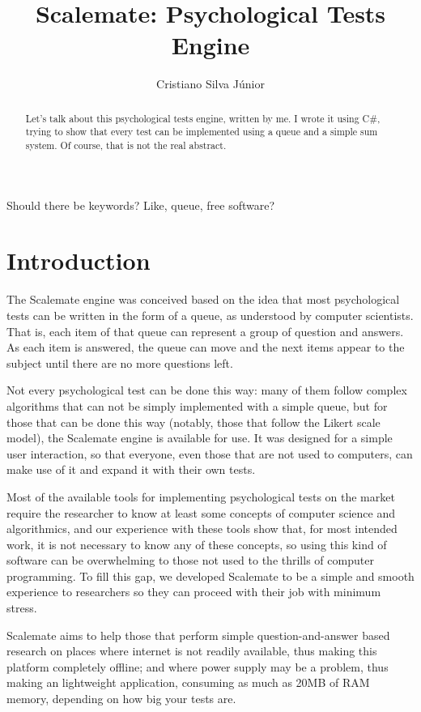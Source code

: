 \documentclass[12pt, a4paper, twoside]{article}
\begin{document}
\title{Scalemate: Psychological Tests Engine}
\author{Cristiano Silva Júnior}
\date{}
\maketitle

\begin{abstract}
Let's talk about this psychological tests engine, written by me. I wrote it using C\#, trying to show that every test can be implemented using a queue and a simple sum system. Of course, that is not the real abstract.
\end{abstract}

Should there be keywords? Like, queue, free software?

\section{Introduction}

The Scalemate engine was conceived based on the idea that most psychological tests can be written in the form of a queue, as understood by computer scientists. That is, each item of that queue can represent a group of question and answers. As each item is answered, the queue can move and the next items appear to the subject until there are no more questions left.

Not every psychological test can be done this way: many of them follow complex algorithms that can not be simply implemented with a simple queue, but for those that can be done this way (notably, those that follow the Likert scale model), the Scalemate engine is available for use. It was designed for a simple user interaction, so that everyone, even those that are not used to computers, can make use of it and expand it with their own tests.

Most of the available tools for implementing psychological tests on the market require the researcher to know at least some concepts of computer science and algorithmics, and our experience with these tools show that, for most intended work, it is not necessary to know any of these concepts, so using this kind of software can be overwhelming to those not used to the thrills of computer programming. To fill this gap, we developed Scalemate to be a simple and smooth experience to researchers so they can proceed with their job with minimum stress.

Scalemate aims to help those that perform simple question-and-answer based research on places where internet is not readily available, thus making this platform completely offline; and where power supply may be a problem, thus making an lightweight application, consuming as much as 20MB of RAM memory, depending on how big your tests are.
\end{document}
